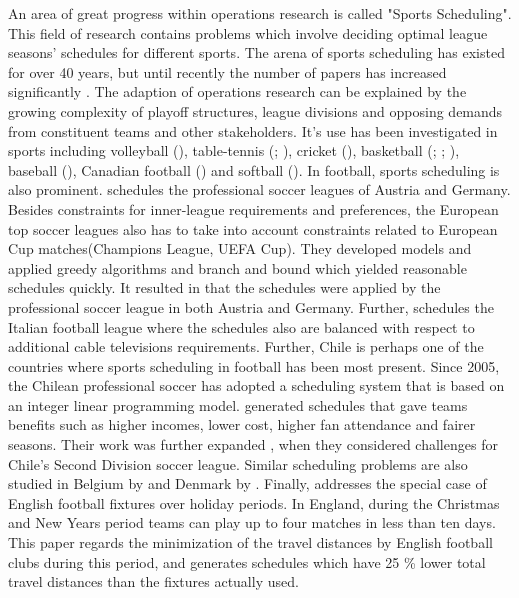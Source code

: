 \newpar

An area of great progress within operations research is called "Sports Scheduling". This field of research contains problems which involve deciding optimal league seasons' schedules for different sports. The arena of sports scheduling has existed for over 40 years, but until recently the number of papers has increased significantly \citep{Kendall}. The adaption of operations research can be explained by the growing complexity of playoff structures, league divisions and opposing demands from constituent teams and other stakeholders.  It's use has been investigated in sports including volleyball (\cite{arg_volleyball}), table-tennis (\cite{Mattfeld}; \cite{Knust}), cricket (\cite{Mwright}), basketball (\cite{Wright}; \cite{van_Voorhis}; \cite{Henz}), baseball (\cite{Trick}), Canadian football (\cite{Kostuk}) and softball (\cite{Saur}). In football, sports scheduling is also prominent. \cite{Bartsch} schedules the professional soccer leagues of Austria and Germany. Besides constraints for inner-league requirements and preferences, the European top soccer leagues also has to take into account constraints related to European Cup matches(Champions League, UEFA Cup). They developed models and applied greedy algorithms and branch and bound which yielded reasonable schedules quickly. It resulted in that the schedules were applied by the professional soccer league in both Austria and Germany. Further, \cite{Della} schedules the Italian football league where the schedules also are balanced with respect to additional cable televisions requirements. Further, Chile is perhaps one of the countries where sports scheduling in football has been most present. Since 2005, the Chilean professional soccer has adopted a scheduling system that is based on an integer linear programming model. \cite{Guajardo} generated schedules that gave teams benefits such as higher incomes, lower cost, higher fan attendance and fairer seasons. Their work was further expanded \citep{Duran}, when they considered challenges for Chile's Second Division soccer league. Similar scheduling problems are also studied in Belgium by  \cite{Goossens} and Denmark by  \cite{Rasmussen}. Finally, \cite{Kendall} addresses the special case of English football fixtures over holiday periods. In England, during the Christmas and New Years period teams can play up to four matches in less than ten days. This paper regards the minimization of the travel distances by English football clubs during this period, and generates schedules which have 25 \% lower total travel distances than the fixtures actually used. 

